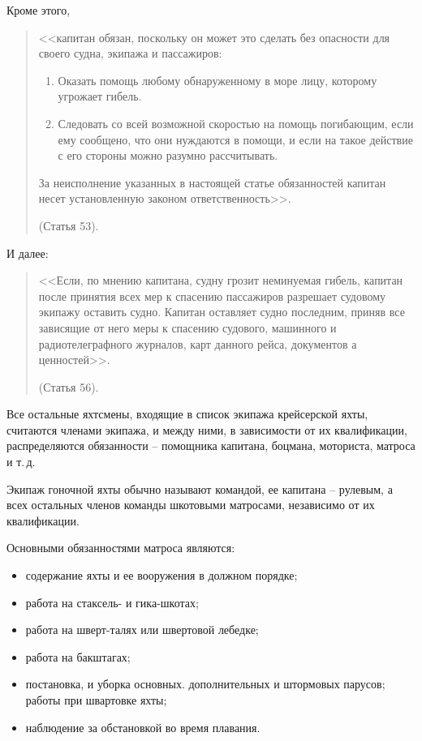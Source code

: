 \documentclass[a4paper, 12pt, twoside, final]{scrbook}
\begin{document}
Кроме этого,

\begin{quote}
<<капитан обязан, поскольку он может это сделать без опасности для своего судна, экипажа и пассажиров:
\begin{enumerate}
\item Оказать помощь любому обнаруженному в море лицу, которому угрожает гибель.
\item Следовать со всей возможной скоростью на помощь погибающим, если ему сообщено, что они нуждаются в помощи, и если на такое действие с его стороны можно разумно рассчитывать.
\end{enumerate}
За неисполнение указанных в настоящей статье обязанностей капитан несет установленную законом ответственность>>.

(Статья 53).
\end{quote}

И далее:

\begin{quote}
<<Если, по мнению капитана, судну грозит неминуемая гибель, капитан после принятия всех мер к спасению пассажиров разрешает судовому экипажу оставить судно. Капитан оставляет судно последним, приняв все зависящие от него меры к спасению судового, машинного и радиотелеграфного журналов, карт данного рейса, документов а ценностей>>.

(Статья 56).
\end{quote}

Все остальные яхтсмены, входящие в список экипажа крейсерской яхты, считаются членами экипажа, и между ними, в зависимости от их квалификации, распределяются обязанности \--- помощника капитана, боцмана, моториста, матроса и т.\,д.

Экипаж гоночной яхты обычно называют командой, ее капитана \--- рулевым, а всех остальных членов команды шкотовыми матросами, независимо от их квалификации.

Основными обязанностями матроса являются:

\begin{itemize}
\item содержание яхты и ее вооружения в должном порядке;
\item работа на стаксель- и гика-шкотах;
\item работа на шверт-талях или швертовой лебедке;
\item работа на бакштагах;
\item постановка, и уборка основных. дополнительных и штормовых парусов; работы при швартовке яхты;
\item наблюдение за обстановкой во время плавания.
\end{itemize}
\end{document}
